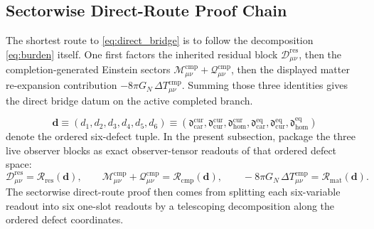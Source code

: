 \documentclass[11pt]{article}
\newcommand{\ResidualDec}{\mathcal D_{\mu\nu}^{\mathrm{res}}}
\newcommand{\CompMix}{\mathcal M_{\mu\nu}^{\mathrm{cmp}}}
\newcommand{\CompQuad}{\mathcal Q_{\mu\nu}^{\mathrm{cmp}}}
\newcommand{\DeltaTComp}{\Delta T_{\mu\nu}^{\mathrm{cmp}}}
\newcommand{\ResidualRead}{\mathscr R_{\mathrm{res}}}
\newcommand{\CompletionRead}{\mathscr R_{\mathrm{cmp}}}
\newcommand{\MatterRead}{\mathscr R_{\mathrm{mat}}}
\begin{document}
\subsection{Sectorwise Direct-Route Proof Chain}

The shortest route to \eqref{eq:direct_bridge} is to follow the decomposition \eqref{eq:burden} itself. One first factors the inherited residual block \(\ResidualDec\), then the completion-generated Einstein sectors \(\CompMix+\CompQuad\), then the displayed matter re-expansion contribution \(-8\pi G_N\,\DeltaTComp\). Summing those three identities gives the direct bridge datum on the active completed branch.

\[
\mathbf d
\equiv
(d_1,d_2,d_3,d_4,d_5,d_6)
\equiv
\left(
\mathfrak d_{\mathrm{car}}^{\mathrm{cur}},
\mathfrak d_{\mathrm{cur}}^{\mathrm{cur}},
\mathfrak d_{\mathrm{hom}}^{\mathrm{cur}},
\mathfrak d_{\mathrm{car}}^{\mathrm{eq}},
\mathfrak d_{\mathrm{cur}}^{\mathrm{eq}},
\mathfrak d_{\mathrm{hom}}^{\mathrm{eq}}
\right)
\]
denote the ordered six-defect tuple. In the present subsection, package the three live observer blocks as exact observer-tensor readouts of that ordered defect space:
\begin{equation}
\ResidualDec=\ResidualRead(\mathbf d),\qquad
\CompMix+\CompQuad=\CompletionRead(\mathbf d),\qquad
-8\pi G_N\,\DeltaTComp=\MatterRead(\mathbf d).
\label{eq:sector_readouts}
\end{equation}
The sectorwise direct-route proof then comes from splitting each six-variable readout into six one-slot readouts by a telescoping decomposition along the ordered defect coordinates.
\end{document}
